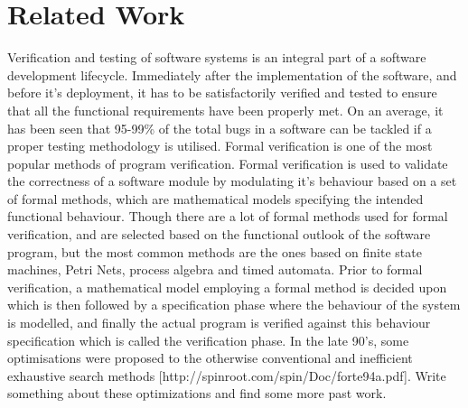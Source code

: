 

\section{Related Work}

Verification and testing of software systems is an integral part of a software development lifecycle. Immediately after the implementation of the software, and before it's deployment, it has to be satisfactorily verified and tested to ensure that all the functional requirements have been properly met. On an average, it has been seen that 95-99\% of the total bugs in a software can be tackled if a proper testing methodology is utilised. Formal verification is one of the most popular methods of program verification. Formal verification is used to validate the correctness of a software module by modulating it's behaviour based on a set of formal methods, which are mathematical models specifying the intended functional behaviour. Though there are a lot of formal methods used for formal verification, and are selected based on the functional outlook of the software program, but the most common methods are the ones based on finite state machines, Petri Nets, process algebra and timed automata. Prior to formal verification, a mathematical model employing a formal method is decided upon which is then followed by a specification phase where the behaviour of the system is modelled, and finally the actual program is verified against this behaviour specification which is called the verification phase. In the late 90's, some optimisations were proposed to the otherwise conventional and inefficient exhaustive search methods [http://spinroot.com/spin/Doc/forte94a.pdf]. Write something about these optimizations and find some more past work.